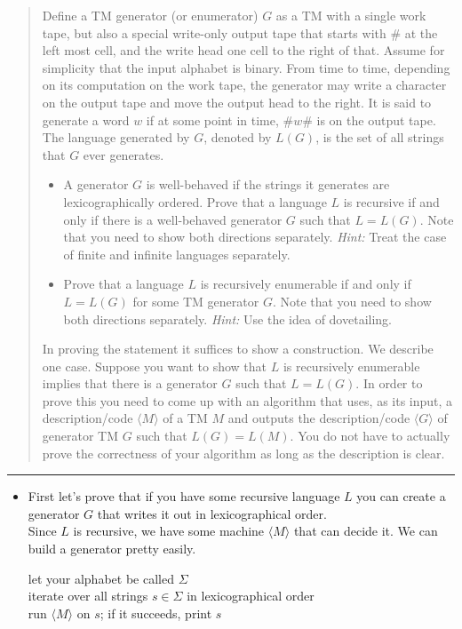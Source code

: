 \documentclass[11pt]{article}
\begin{document}
\begin{quote}
Define a TM generator (or enumerator) $G$ as a TM with a single
  work tape, but also a special write-only output tape that starts
  with $\#$ at the left most cell, and the write head one cell to the
  right of that.  Assume for simplicity that the input alphabet is
  binary.  From time to time, depending on its computation on the work
  tape, the generator may write a character on the output tape and
  move the output head to the right.  It is said to generate a word
  $w$ if at some point in time, $\#w\#$ is on the output tape. The
  language generated by $G$, denoted by $L(G)$, is the set of all
  strings that $G$ ever generates.
  \begin{itemize}
  \item A generator $G$ is well-behaved if the strings it generates
    are lexicographically ordered. Prove that a language $L$ is
    recursive if and only if there is a well-behaved generator $G$ such
    that $L=L(G)$. Note that you need
    to show both directions separately. {\em Hint:} Treat the case of finite and
    infinite languages separately.

  \item Prove that a language $L$ is recursively enumerable if and
    only if $L = L(G)$ for some TM generator $G$. Note that you need
    to show both directions separately. {\em Hint:} Use the idea of
    dovetailing.
  \end{itemize}
  In proving the statement it suffices to show a construction. We
  describe one case. Suppose you want to show that $L$ is recursively
  enumerable implies that there is a generator $G$ such that
  $L = L(G)$. In order to prove this you need to come up with an
  algorithm that uses, as its input, a description/code
  $\langle M \rangle$ of a TM $M$ and outputs the description/code
  $\langle G \rangle$ of generator TM $G$ such that $L(G) = L(M)$.  You
  do not have to actually prove the correctness of your algorithm as long as
  the description is clear.
\end{quote}
\hrule



\begin{solution}
    \begin{itemize}
        \item First let's prove that if you have some recursive language $L$ you can create a generator $G$ that writes it out in lexicographical order.
            \\ Since $L$ is recursive, we have some machine $\langle M \rangle$ that can decide it. We can build a generator pretty easily. 
            \begin{algo}
                let your alphabet be called $\Sigma$
                \\ iterate over all strings $s \in \Sigma$ in lexicographical order \+
                \\ run $\langle M \rangle$ on $s$; if it succeeds, print $s$
            \end{algo}
    \end{itemize}
\end{solution}
\end{document}
